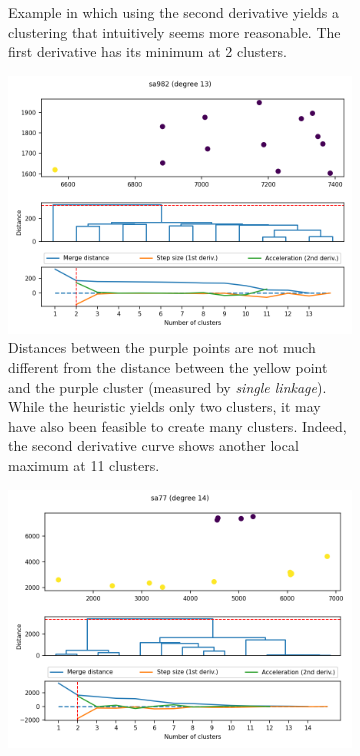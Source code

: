 \documentclass[
	fontsize=10pt, %
	twoside=false, %
	secnumdepth=1, %
]{kaobook}
\begin{document}
\begin{figure}[h]
\begin{subfigure}{0.48\linewidth}
    \caption{Example in which using the second derivative yields a clustering
      that intuitively seems more reasonable. The first derivative has its
      minimum
      at 2 clusters. 
    }
  \end{subfigure}
      \begin{subfigure}{0.48\linewidth}
        \includegraphics[width=\textwidth]{dendrograms/sa982.png}
        \caption{
          Distances between the purple points are not much
          different from the distance between the yellow point and the purple
          cluster (measured by \textit{single linkage}). While the heuristic yields
          only two clusters, it may have also been feasible to create many clusters.
          Indeed, the second derivative curve shows another local maximum at 11 clusters.
        }
      \end{subfigure}
      \begin{subfigure}{0.48\linewidth}
        \includegraphics[width=\textwidth]{dendrograms/sa77-variance.png}

\end{subfigure}
\end{figure}
\end{document}
